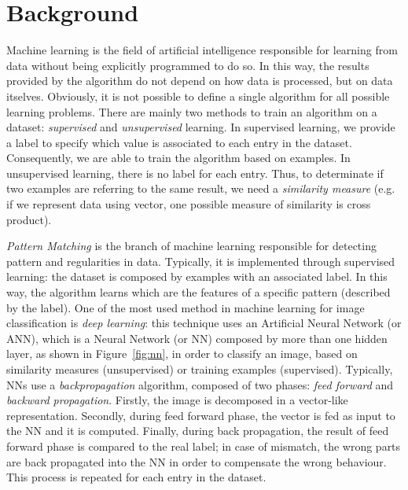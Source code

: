 \section{Background}
\label{sec:background}

Machine learning is the field of artificial intelligence responsible for 
learning from data without being explicitly programmed to do so. In this way, 
the results provided by the algorithm do not depend on how data is processed, 
but on data itselves. Obviously, it is not possible to define a single algorithm 
for all possible learning problems. There are mainly two methods to train an 
algorithm on a dataset: \textit{supervised} and \textit{unsupervised} learning. 
In supervised learning, we provide a label to specify which value is associated 
to each entry in the dataset. Consequently, we are able to train the algorithm 
based on examples. In unsupervised learning, there is no label for each entry. 
Thus, to determinate if two examples are referring to the same result, we need a 
\textit{similarity measure} (e.g. if we represent data using vector, one 
possible measure of similarity is cross product).

\textit{Pattern Matching} is the branch of machine learning responsible for 
detecting pattern and regularities in data. Typically, it is implemented through 
supervised learning: the dataset is composed by examples with an associated 
label. In this way, the algorithm learns which are the features of a specific 
pattern (described by the label).
One of the most used method in machine learning for image classification is 
\textit{deep learning}: this technique uses an Artificial Neural Network (or 
ANN), which is a Neural Network (or NN) composed by more than one hidden layer, 
as shown in Figure~\ref{fig:nn}, in order to classify an image, based on 
similarity measures (unsupervised) or training examples (supervised). Typically, 
NNs use a \textit{backpropagation} algorithm, composed of two phases: 
\textit{feed forward} and \textit{backward propagation}. Firstly, the image is 
decomposed in a vector-like representation. Secondly, during feed forward phase, 
the vector is fed as input to the NN and it is computed. Finally, during back 
propagation, the result of feed forward phase is compared to the real label; in 
case of mismatch, the wrong parts are back propagated into the NN in order to 
compensate the wrong behaviour. This process is repeated for each entry in the 
dataset.


